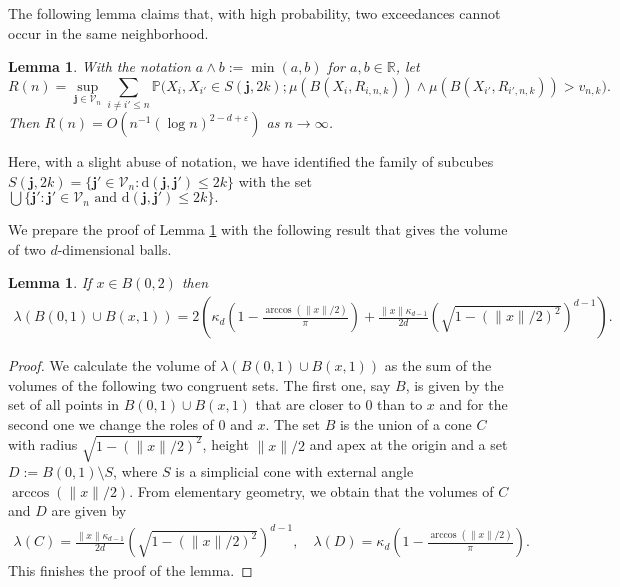 \documentclass{article}
\theoremstyle{thm}
\newtheorem{lemma}[theorem]{Lemma}
\theoremstyle{definition}
\theoremstyle{definition}
\theoremstyle{def}
\newcommand{\PP}{\mathbb{P}} %
\newcommand{\jj}{\mathbf{j}}
\newcommand{\VV}{\mathcal{V}_n}
\begin{document}
The following lemma claims that, with high probability, two exceedances cannot occur in the same neighborhood.

\begin{lemma}
\label{Le:localproperty}
With the notation $a \wedge b := \min(a,b)$ for $a,b \in \mathbb{R}$, let
\[
R(n)= \sup_{\jj\in\VV}\sum_{i\neq i'\leq n} \PP \big( X_i,X_{i'}\in S(\jj,2k); \mu(B(X_i,R_{i,n,k})) \wedge \mu(B(X_{i'},R_{i',n,k}))>v_{n,k} \big).
\]
Then $R(n) = O(n^{-1}(\log n)^{2-d+\varepsilon})$ as $n \to \infty$.
\end{lemma}
Here, with a slight abuse of notation, we have identified the family of subcubes $S(\jj,2k)=\{\jj'\in \VV: \text{d}(\jj,\jj')\leq 2k\}$
with the set $\bigcup \big\{\jj': \jj'\in \VV \text{ and }  \text{d}(\jj,\jj')\leq 2k\}.$



We prepare the proof of Lemma \ref{Le:localproperty} with the following {result} that gives the volume of two $d$-dimensional balls.

\begin{lemma} \label{Le:balls}
	{If $x \in B(0,2)$ then}
	\begin{align*}
		\lambda(B(0,1)\cup B(x,1))=2\left(\kappa_d \left(1-\frac{\arccos(\|x\|/2)}{\pi}\right)+\frac{\|x\|\kappa_{d-1}}{2d}\left(\sqrt{1-(\|x\|/2)^2}\right)^{d-1}\right).
	\end{align*}
\end{lemma}

\begin{proof}
	We calculate the volume of $\lambda(B(0,1)\cup B(x,1))$ as the sum of the volumes of the following two congruent sets. The first one, say $B$, is given by the set of all points in $B(0,1)\cup B(x,1)$ that are closer to $0$ than to $x$ and for the second one we change the roles of $0$ and $x$. The set $B$ is the union of a cone $C$ with radius $\sqrt{1-(\|x\|/2)^2}$, height $\|x\|/2$ and apex at the origin and a set $D:=B(0,1)\setminus S$, where $S$ is a simplicial cone with external angle $\arccos(\|x\|/2)$. From elementary geometry, we obtain that the volumes of $C$ and $D$ are given by
	\begin{align*}
		\lambda(C)=\frac{\|x\|\kappa_{d-1}}{2d}\left(\sqrt{1-(\|x\|/2)^2}\right)^{d-1},\quad
		\lambda(D)=\kappa_d \left(1-\frac{\arccos(\|x\|/2)}{\pi}\right).
	\end{align*}
	This finishes the proof of the lemma.
\end{proof}
\end{document}
